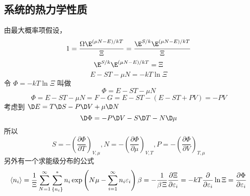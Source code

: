 \subsection{系统的热力学性质}
由最大概率项假设，
\begin{equation}
1 = \frac{{\Omega {\E^{{{\left( {\mu N - E} \right)} \mathord{\left/
 {\vphantom {{\left( {\mu N - E} \right)} {kT}}} \right.
 \kern-\nulldelimiterspace} {kT}}}}}}{\Xi } = \frac{{{\E^{S/k}}{\E^{{{\left( {\mu N - E} \right)} \mathord{\left/
 {\vphantom {{\left( {\mu N - E} \right)} {kT}}} \right.
 \kern-\nulldelimiterspace} {kT}}}}}}{\Xi }
\end{equation}
\begin{equation} 
 {\E^{S/k}}{\E^{{{\left( {\mu N - E} \right)} \mathord{\left/
 {\vphantom {{\left( {\mu N - E} \right)} {kT}}} \right.
 \kern-\nulldelimiterspace} {kT}}}} = \Xi 
\end{equation}
\begin{equation} 
 E - ST - \mu N =  - kT\ln \Xi
\end{equation}
令 $\Phi  =  - kT\ln \Xi $ 叫做
\begin{equation}
 \Phi  = E - ST - \mu N
\end{equation}
\begin{equation}
\Phi  = E - ST - \mu N = F - G = E - ST - (E - ST + PV) =  - PV
\end{equation}
考虑到 $ \D E = T\D S - P\D V + \mu \D N$
\begin{equation}
\D \Phi  =  - P\D V - S\D T - N\D \mu
\end{equation}
所以
\begin{equation}
S =  - {\left( {\frac{{\partial \Phi }}{{\partial T}}} \right)_{V,\mu }} , N =  - {\left( {\frac{{\partial \Phi }}{{\partial \mu }}} \right)_{V,T}} , P =  - {\left( {\frac{{\partial \Phi }}{{\partial V}}} \right)_{T,\mu }}
\end{equation}
另外有一个求能级分布的公式
\begin{equation}
\left\langle {{n_i}} \right\rangle  = \frac{1}{\Xi }\sum\limits_{N = 1}^\infty  {\sum\limits_{\{ {n_i}\} }^ *  {{n_i}\exp \left( {N\mu  - \sum\limits_{i = 1}^\infty  {{n_i}{\varepsilon _i}} } \right)\beta } }  =  - \frac{1}{{\beta {\kern 1pt} \Xi }}\frac{{\partial \Xi }}{{\partial {\varepsilon _i}}} =  - kT\frac{\partial }{{\partial {\varepsilon _i}}}\ln \Xi  = \frac{{\partial \Phi }}{{\partial {\varepsilon _i}}}
\end{equation}